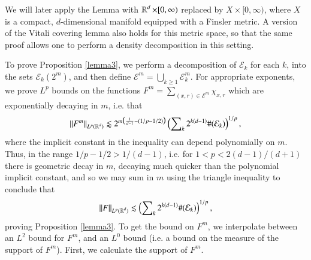 \begin{remark}
  We will later apply the Lemma with $\operatorname{\mathbb{R}}^d \times [0,\infty)$ replaced by $X \times [0,\infty)$, where $X$ is a compact, $d$-dimensional manifold equipped with a Finsler metric. A version of the Vitali covering lemma also holds for this metric space, so that the same proof allows one to perform a density decomposition in this setting.
\end{remark}

To prove Proposition \ref{lemma3}, we perform a decomposition of $\mathcal{E}_k$ for each $k$, into the sets $\mathcal{E}_k(2^m)$, and then define $\mathcal{E}^m = \bigcup_{k \geq 1} \mathcal{E}_k^m$. For appropriate exponents, we prove $L^p$ bounds on the functions $F^m = \sum\nolimits_{(x,r) \in \mathcal{E}^m} \chi_{x,r}$ which are exponentially decaying in $m$, i.e. that
%
\begin{equation}
  \| F^m \|_{L^p(\operatorname{\mathbb{R}}^d)} \lessapprox 2^{m \big( \frac{1}{d-1} - (1/p - 1/2) \big)} \left( \sum\nolimits_k 2^{k(d-1)} \#(\mathcal{E}_k) \right)^{1/p},
\end{equation}
where the implicit constant in the inequality can depend polynomially on $m$. Thus, in the range $1/p - 1/2 > 1/(d-1)$, i.e. for $1 < p < 2(d-1)/(d+1)$ there is geometric decay in $m$, decaying much quicker than the polynomial implicit constant, and so we may sum in $m$ using the triangle inequality to conclude that
%
\begin{equation}
  \| F \|_{L^p(\operatorname{\mathbb{R}}^d)} \lesssim \left( \sum\nolimits_k 2^{k(d-1)} \#(\mathcal{E}_k) \right)^{1/p},
\end{equation}
%
proving Proposition \ref{lemma3}. To get the bound on $F^m$, we interpolate between an $L^2$ bound for $F^m$, and an $L^0$ bound (i.e. a bound on the measure of the support of $F^m$). First, we calculate the support of $F^m$.

